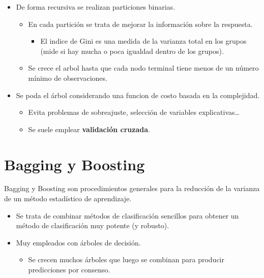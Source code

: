 \documentclass[]{book}
\providecommand{\tightlist}{%
  \setlength{\itemsep}{0pt}\setlength{\parskip}{0pt}}
\begin{document}
\begin{itemize}
\item
  De forma recursiva se realizan particiones binarias.

  \begin{itemize}
  \item
    En cada partición se trata de mejorar la información sobre la
    respuesta.

    \begin{itemize}
    \tightlist
    \item
      El indice de Gini es una medida de la varianza total en los grupos
      (mide si hay mucha o poca igualdad dentro de los grupos).
    \end{itemize}
  \item
    Se crece el arbol hasta que cada nodo terminal tiene menos de un
    número mínimo de observaciones.
  \end{itemize}
\item
  Se poda el árbol considerando una funcion de costo basada en la
  complejidad.

  \begin{itemize}
  \item
    Evita problemas de sobreajuste, selección de variables
    explicativas\ldots{}
  \item
    Se suele emplear \textbf{validación cruzada}.
  \end{itemize}
\end{itemize}

\section{Bagging y Boosting}\label{bagging-y-boosting}

Bagging y Boosting son procedimientos generales para la reducción de la
varianza de un método estadístico de aprendizaje.

\begin{itemize}
\item
  Se trata de combinar métodos de clasificación sencillos para obtener
  un método de clasificación muy potente (y robusto).
\item
  Muy empleados con árboles de decisión.

  \begin{itemize}
  \tightlist
  \item
    Se crecen muchos árboles que luego se combinan para producir
    predicciones por consenso.
  \end{itemize}
\end{itemize}
\end{document}
